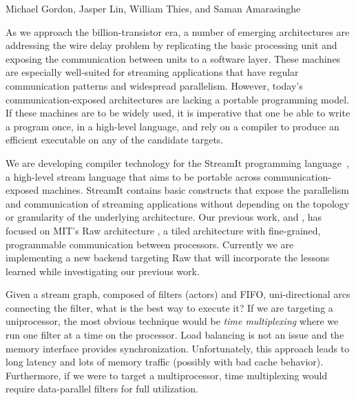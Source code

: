 \documentclass{csailabstractbook}
\begin{document}


         {Michael Gordon, Jasper Lin, William Thies, and Saman Amarasinghe}



As we approach the billion-transistor era, a number of emerging
architectures are addressing the wire delay problem by replicating the
basic processing unit and exposing the communication between units to
a software layer.  These machines are especially well-suited for
streaming applications that have regular communication patterns and
widespread parallelism.  However, today's communication-exposed
architectures are lacking a portable programming model.  If these
machines are to be widely used, it is imperative that one be able to
write a program once, in a high-level language, and rely on a compiler
to produce an efficient executable on any of the candidate targets.

We are developing compiler technology for the StreamIt programming
language~\cite{streamitcc}, a high-level stream language that aims to
be portable across communication-exposed machines.  StreamIt contains
basic constructs that expose the parallelism and communication of
streaming applications without depending on the topology or
granularity of the underlying architecture.  Our previous work,
\cite{streamit-asplos} and \cite{mgordon-thesis}, has focused on 
MIT's Raw architecture \cite{raw}, a tiled architecture 
with fine-grained, programmable communication between processors.
Currently we are implementing a new backend targeting Raw that will
incorporate the lessons learned while investigating our previous work.


Given a stream graph, composed of filters (actors) and FIFO,
uni-directional arcs connecting the filter, what is the best way to
execute it?  If we are targeting a uniprocessor, the most obvious
technique would be {\it time multiplexing} where we run one filter at a time
on the processor.  Load balancing is not an issue and the memory
interface provides synchronization.  Unfortunately, this approach
leads to long latency and lots of memory traffic (possibly with bad cache
behavior).  Furthermore, if we were to target a multiprocessor, 
time multiplexing would require data-parallel filters for full
utilization. 
\end{document}
